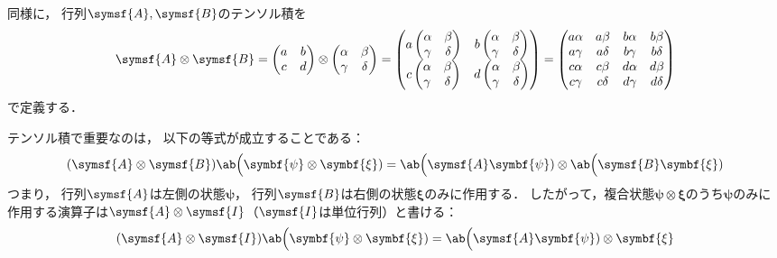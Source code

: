 \documentclass[
]{sotsu}
\newcommand{\bpsi}{\symbf{\psi}}
\newcommand{\bxi}{\symbf{\xi}}
\begin{document}
同様に，
行列$\symsf{A}, \symsf{B}$のテンソル積を
\begin{equation}
    \label{eq:tensor-product-of-2-matrix}
    \symsf{A} \otimes \symsf{B}
    =
    \begin{pmatrix}
        a  & b  \\ c  & d 
    \end{pmatrix}
    \otimes 
    \begin{pmatrix}
        \alpha & \beta \\ \gamma & \delta
    \end{pmatrix}
    =
    \begin{pmatrix}
        a
        \begin{pmatrix}
            \alpha & \beta \\ \gamma & \delta
        \end{pmatrix}
        &
        b
        \begin{pmatrix}
            \alpha & \beta \\ \gamma & \delta
        \end{pmatrix}
        \\
        c
        \begin{pmatrix}
            \alpha & \beta \\ \gamma & \delta
        \end{pmatrix}
        &
        d
        \begin{pmatrix}
            \alpha & \beta \\ \gamma & \delta
        \end{pmatrix}
    \end{pmatrix}
    =
    \begin{pmatrix}
        a \alpha  &  a \beta   &  b \alpha  &  b \beta   \\
        a \gamma  &  a \delta  &  b \gamma  &  b \delta  \\
        c \alpha  &  c \beta   &  d \alpha  &  d \beta   \\
        c \gamma  &  c \delta  &  d \gamma  &  d \delta  
    \end{pmatrix}
\end{equation}
で定義する．

テンソル積で重要なのは，
以下の等式が成立することである：
\begin{equation}
    \label{eq:tensor-product-matrix-vector}
    (\symsf{A} \otimes \symsf{B}) \ab\Big(\bpsi \otimes \bxi)
    = \ab\Big(\symsf{A} \bpsi) \otimes \ab\Big(\symsf{B} \bxi)
\end{equation}
つまり，
行列$\symsf{A}$は左側の状態$\bpsi$，
行列$\symsf{B}$は右側の状態$\bxi$のみに作用する．
したがって，複合状態$\bpsi \otimes \bxi$のうち$\bpsi$のみに作用する演算子は$\symsf{A} \otimes \symsf{I}$（$\symsf{I}$は単位行列）と書ける：
\begin{equation*}
    (\symsf{A} \otimes \symsf{I}) \ab\Big(\bpsi \otimes \bxi)
    = \ab\Big(\symsf{A} \bpsi) \otimes \bxi
\end{equation*}
\end{document}
